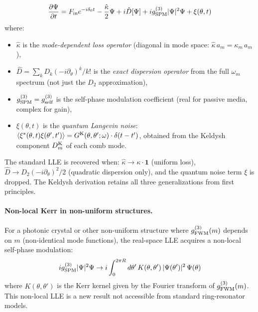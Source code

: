\documentclass[12pt]{article}
\newcommand{\Keldysh}{{\rm K}}
\begin{document}
\begin{keyresult}
\begin{equation}
  \frac{\partial\Psi}{\partial t} =
  F_{\rm in} e^{-i\delta_0 t}
  - \frac{\hat{\kappa}}{2}\Psi
  + i\hat{D}[\Psi]
  + ig^{(3)}_{\rm SPM}|\Psi|^2\Psi
  + \xi(\theta,t)
  \label{eq:generalized_LLE}
\end{equation}
where:
\begin{itemize}
  \item $\hat{\kappa}$ is the \emph{mode-dependent loss operator}
    (diagonal in mode space: $\hat{\kappa}\,a_m = \kappa_m\,a_m$),
  \item $\hat{D} = \sum_k D_k(-i\partial_\theta)^k/k!$ is the
    \emph{exact dispersion operator} from the full $\omega_m$ spectrum
    (not just the $D_2$ approximation),
  \item $g^{(3)}_{\rm SPM} = g^{(3)}_{\rm self}$ is the self-phase
    modulation coefficient (real for passive media, complex for gain),
  \item $\xi(\theta,t)$ is the \emph{quantum Langevin noise}:
    $\langle\xi^*(\theta,t)\xi(\theta',t')\rangle =
    G^\Keldysh(\theta,\theta';\omega)\cdot\delta(t-t')$,
    obtained from the Keldysh component $D^\Keldysh_m$
    of each comb mode.
\end{itemize}
\end{keyresult}

The standard LLE \cite{LugiatoLefever1987} is recovered when:
$\hat{\kappa}\to\kappa\cdot\mathbf{1}$ (uniform loss),
$\hat{D}\to D_2(-i\partial_\theta)^2/2$ (quadratic dispersion only),
and the quantum noise term $\xi$ is dropped.  The Keldysh derivation
retains all three generalizations from first principles.

\paragraph{Non-local Kerr in non-uniform structures.}
For a photonic crystal or other non-uniform structure where
$g^{(3)}_{\rm FWM}(m)$ depends on $m$ (non-identical mode functions),
the real-space LLE acquires a non-local self-phase modulation:
\begin{equation}
  ig^{(3)}_{\rm SPM}|\Psi|^2\Psi \to
  i\int_0^{2\pi R} d\theta'\,K(\theta,\theta')\,
  |\Psi(\theta')|^2\,\Psi(\theta)
  \label{eq:nonlocal_SPM}
\end{equation}
where $K(\theta,\theta')$ is the Kerr kernel given by the Fourier
transform of $g^{(3)}_{\rm FWM}(m)$.  This non-local LLE is a new
result not accessible from standard ring-resonator models.
\end{document}
